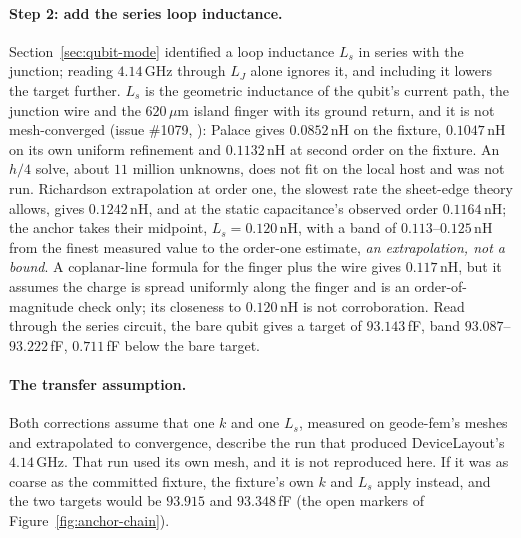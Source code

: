 \documentclass{anvil-paper}
\begin{document}
\paragraph{Step 2: add the series loop inductance.}
Section~\ref{sec:qubit-mode} identified a loop inductance $L_s$ in
series with the junction; reading $4.14$\,GHz through $L_J$ alone
ignores it, and including it lowers the target further. $L_s$ is the
geometric inductance of the qubit's current path, the junction wire and
the $620\,\mu$m island finger with its ground return, and it is not
mesh-converged (issue \#1079,
): Palace gives
$0.0852$\,nH on the fixture, $0.1047$\,nH on its own uniform
refinement and $0.1132$\,nH at second order on the fixture. An $h/4$
solve, about $11$ million unknowns, does not fit on the local host and
was not run.
Richardson extrapolation at order one, the slowest rate the sheet-edge
theory allows, gives $0.1242$\,nH, and at the static capacitance's
observed order $0.1164$\,nH; the anchor takes their midpoint,
$L_s = 0.120$\,nH, with a band of $0.113$--$0.125$\,nH from the finest
measured value to the order-one estimate, \emph{an extrapolation, not
a bound}. A coplanar-line formula for the finger plus the wire gives
$0.117$\,nH, but it assumes the charge is spread uniformly along the
finger and is an order-of-magnitude check only; its closeness to
$0.120$\,nH is not corroboration. Read through the series circuit, the
bare qubit gives a target of $93.143$\,fF, band
$93.087$--$93.222$\,fF, $0.711$\,fF below the bare target.

\paragraph{The transfer assumption.}
Both corrections assume that one $k$ and one $L_s$, measured on
geode-fem's meshes and extrapolated to convergence, describe the run
that produced DeviceLayout's $4.14$\,GHz. That run used its own mesh, and
it is not reproduced here. If it was as coarse as the committed
fixture, the fixture's own $k$ and $L_s$ apply instead, and the two
targets would be $93.915$ and $93.348$\,fF (the open markers of
Figure~\ref{fig:anchor-chain}).
\end{document}
